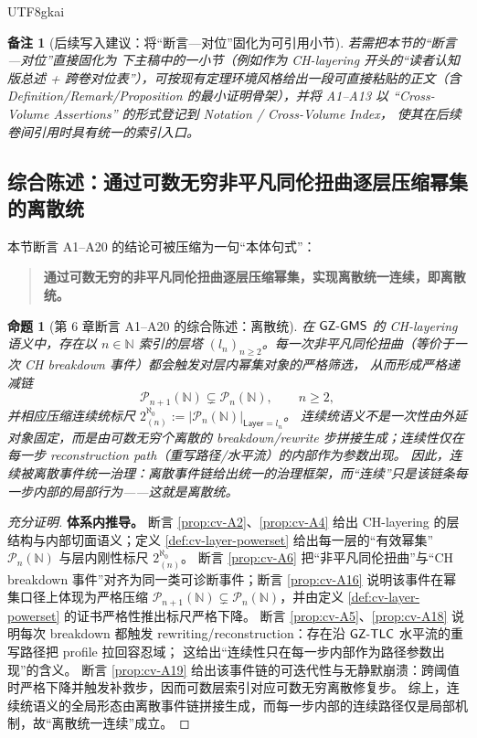 \documentclass[12pt]{article}
\newtheorem{proposition}{命题}[section]
\newtheorem{remark}{备注}[section]
\newcommand{\code}[1]{\path{#1}}
\begin{document}
\begin{CJK*}{UTF8}{gkai}
\begin{remark}[后续写入建议：将“断言—对位”固化为可引用小节]
若需把本节的“断言—对位”直接固化为 \code{docs/PureMath/} 下主稿中的一小节（例如作为 CH-layering 开头的“读者认知版总述 + 跨卷对位表”），可按现有定理环境风格给出一段可直接粘贴的正文（含
  Definition/Remark/Proposition 的最小证明骨架），并将 A1--A13 以 “Cross-Volume Assertions” 的形式登记到 Notation / Cross-Volume Index，
  使其在后续卷间引用时具有统一的索引入口。
\end{remark}

\subsection{综合陈述：通过可数无穷非平凡同伦扭曲逐层压缩幂集的离散统}

本节断言 A1--A20 的结论可被压缩为一句“本体句式”：
\begin{quote}
\textbf{通过可数无穷的非平凡同伦扭曲逐层压缩幂集，实现离散统一连续，即离散统。}
\end{quote}

\begin{proposition}[第 6 章断言 A1--A20 的综合陈述：离散统]\label{prop:cv-summary-discrete-unify}
在 $\mathsf{GZ\text{-}GMS}$ 的 CH-layering 语义中，存在以 $n\in\mathbb N$ 索引的层塔 $(l_n)_{n\ge2}$。每一次非平凡同伦扭曲（等价于一次 CH breakdown 事件）都会触发对层内幂集对象的严格筛选，
  从而形成严格递减链
\[
  \mathcal P_{n+1}(\mathbb N)\subsetneq \mathcal P_n(\mathbb N),\qquad n\ge2,
\]
并相应压缩连续统标尺 $2^{\aleph_0}_{(n)}:=|\mathcal P_n(\mathbb N)|_{\mathsf{Layer}=l_n}$。
连续统语义不是一次性由外延对象固定，而是由可数无穷个离散的 breakdown/rewrite 步拼接生成；连续性仅在每一步 reconstruction path（重写路径/水平流）的内部作为参数出现。
因此，连续被离散事件统一治理：离散事件链给出统一的治理框架，而“连续”只是该链条每一步内部的局部行为——这就是离散统。
\end{proposition}

\begin{proof}[充分证明]
\textbf{体系内推导。}
断言 \ref{prop:cv-A2}、\ref{prop:cv-A4} 给出 CH-layering 的层结构与内部切面语义；定义 \ref{def:cv-layer-powerset} 给出每一层的“有效幂集” $\mathcal
  P_n(\mathbb N)$ 与层内刚性标尺 $2^{\aleph_0}_{(n)}$。
断言 \ref{prop:cv-A6} 把“非平凡同伦扭曲”与“CH breakdown 事件”对齐为同一类可诊断事件；断言 \ref{prop:cv-A16} 说明该事件在幂集口径上体现为严格压缩 $\mathcal P_{n+1}
  (\mathbb N)\subsetneq \mathcal P_n(\mathbb N)$，并由定义 \ref{def:cv-layer-powerset} 的证书严格性推出标尺严格下降。
断言 \ref{prop:cv-A5}、\ref{prop:cv-A18} 说明每次 breakdown 都触发 rewriting/reconstruction：存在沿 $\mathsf{GZ\text{-}TLC}$ 水平流的重写路径把 profile 拉回容忍域；
  这给出“连续性只在每一步内部作为路径参数出现”的含义。
断言 \ref{prop:cv-A19} 给出该事件链的可迭代性与无静默崩溃：跨阈值时严格下降并触发补救步，因而可数层索引对应可数无穷离散修复步。
综上，连续统语义的全局形态由离散事件链拼接生成，而每一步内部的连续路径仅是局部机制，故“离散统一连续”成立。


\end{proof}
\end{CJK*}
\end{document}
